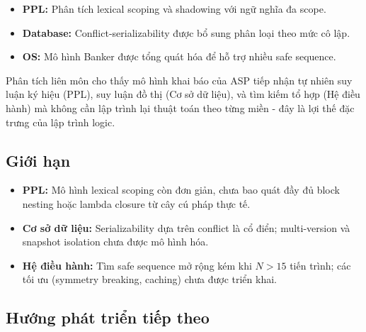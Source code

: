 \documentclass[a4paper,11pt]{article}
\begin{document}
\begin{itemize}
    \item \textbf{PPL:} Phân tích lexical scoping và shadowing với ngữ nghĩa đa scope.
    \item \textbf{Database:} Conflict-serializability được bổ sung phân loại theo mức cô lập.
    \item \textbf{OS:} Mô hình Banker được tổng quát hóa để hỗ trợ nhiều safe sequence.
\end{itemize}

  Phân tích liên môn cho thấy mô hình khai báo của ASP tiếp nhận tự nhiên
  suy luận ký hiệu (PPL), suy luận đồ thị (Cơ sở dữ liệu), và tìm kiếm tổ hợp (Hệ điều hành)
  mà không cần lập trình lại thuật toán theo từng miền - đây là lợi thế đặc trưng của lập trình logic.

\subsection*{Giới hạn}

\begin{itemize}
    \item \textbf{PPL:} Mô hình lexical scoping còn đơn giản, chưa bao quát đầy đủ block nesting
      hoặc lambda closure từ cây cú pháp thực tế.
    \item \textbf{Cơ sở dữ liệu:} Serializability dựa trên conflict là cổ điển; multi-version và snapshot
      isolation chưa được mô hình hóa.
    \item \textbf{Hệ điều hành:} Tìm safe sequence mở rộng kém khi $N > 15$ tiến trình; các tối ưu (symmetry
      breaking, caching) chưa được triển khai.
\end{itemize}

\subsection*{Hướng phát triển tiếp theo}
\end{document}

